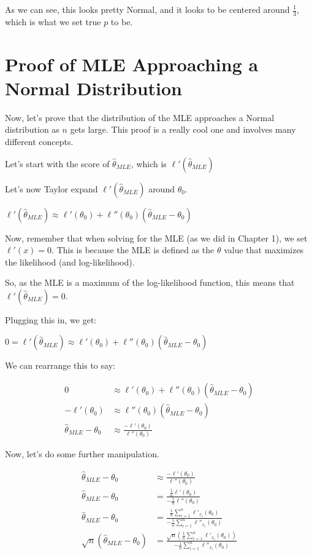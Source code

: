 \documentclass[
  letterpaper,
  DIV=11,
  numbers=noendperiod]{scrreprt}
\begin{document}
As we can see, this looks pretty Normal, and it looks to be centered
around \(\frac{1}{3}\), which is what we set true \(p\) to be.

\section{Proof of MLE Approaching a Normal
Distribution}\label{proof-of-mle-approaching-a-normal-distribution}

Now, let's prove that the distribution of the MLE approaches a Normal
distribution as \(n\) gets large. This proof is a really cool one and
involves many different concepts.

Let's start with the score of \(\hat{\theta}_{MLE}\), which is
\(\ell'(\hat{\theta}_{MLE})\)

Let's now Taylor expand \(\ell'(\hat{\theta}_{MLE})\) around
\(\theta_0\).

\(\ell'(\hat{\theta}_{MLE}) \approx \ell'(\theta_0) + \ell''(\theta_0)(\hat{\theta}_{MLE} - \theta_0)\)

Now, remember that when solving for the MLE (as we did in Chapter 1), we
set \(\ell'(x) = 0\). This is because the MLE is defined as the
\(\theta\) value that maximizes the likelihood (and log-likelihood).

So, as the MLE is a maximum of the log-likelihood function, this means
that \(\ell'(\hat{\theta}_{MLE}) = 0\).

Plugging this in, we get:

\(0 = \ell'(\hat{\theta}_{MLE}) \approx \ell'(\theta_0) + \ell''(\theta_0)(\hat{\theta}_{MLE} - \theta_0)\)

We can rearrange this to say:

\[
\begin{aligned}
  0 &\approx \ell'(\theta_0) + \ell''(\theta_0)(\hat{\theta}_{MLE} - \theta_0) \\
  - \ell'(\theta_0) &\approx \ell''(\theta_0)(\hat{\theta}_{MLE} - \theta_0) \\
  \hat{\theta}_{MLE} - \theta_0  &\approx \frac{-\ell'(\theta_0)}{\ell''(\theta_0)}
\end{aligned}
\]

Now, let's do some further manipulation.

\[
\begin{aligned}
  \hat{\theta}_{MLE} - \theta_0  &\approx \frac{-\ell'(\theta_0)}{\ell''(\theta_0)} \\
    \hat{\theta}_{MLE} - \theta_0  &= \frac{\frac{1}{n}\ell'(\theta_0)}{-\frac{1}{n}\ell''(\theta_0)} \\ 
      \hat{\theta}_{MLE} - \theta_0  &=  \frac{\frac{1}{n}\sum_{i=1}^n \ell'_{x_i}(\theta_0)}{-\frac{1}{n}\sum_{i=1}^n\ell''_{x_i}(\theta_0)} \\ 
      \sqrt{n}(\hat{\theta}_{MLE} - \theta_0)  &= \frac{\sqrt{n}(\frac{1}{n}\sum_{i=1}^n \ell'_{x_i}(\theta_0))}{-\frac{1}{n}\sum_{i=1}^n\ell''_{x_i}(\theta_0)} \\ 
\end{aligned}
\]
\end{document}
